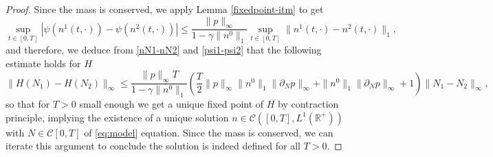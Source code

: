 \documentclass[11pt,a4paper]{article}
\newcommand{\R}{\mathbb{R}}
\begin{document}
\begin{proof}
    Since the mass is conserved, we apply Lemma \ref{fixedpoint-itm} to get
    \begin{equation}
    \label{psi1-psi2}
        \sup_{t\in [0,T]}|\psi(n^1(t,\cdot))-\psi(n^2(t,\cdot))|\le \frac{\|p\|_\infty}{1-\gamma\|n^0\|_1}\sup_{t\in[0,T]}\|n^1(t,\cdot)-n^2(t,\cdot)\|_1,  
    \end{equation}
    and therefore, we deduce from \eqref{nN1-nN2} and \eqref{psi1-psi2} that the following estimate holds for $H$
\begin{equation*}
        \|H(N_1)-H(N_2)\|_\infty\le \frac{\|p\|_\infty T}{1-\gamma\|n^0\|_1}\left(\frac{T}{2}\|p\|_\infty\|n^0\|_1\|\partial_N p\|_\infty+\|n^0\|_1\|\partial_N p\|_\infty+1\right)\|N_1-N_2\|_\infty,
\end{equation*}
    so that for $T>0$ small enough we get a unique fixed point of $H$ by contraction principle, implying the existence of a unique solution $n\in \mathcal{C}\left([0,T],L^1(\R^+)\right)$ with $N\in\mathcal{C}[0,T]$ of \eqref{eq:model} equation. Since the mass is conserved, we can iterate this argument to conclude the solution is indeed defined for all $T>0$.
\end{proof}
\end{document}
